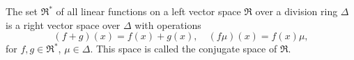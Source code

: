 The set $\mathfrak{R}^*$ of all linear functions on a left vector space $\mathfrak{R}$ over a division ring $\Delta$ is a right vector space over $\Delta$ with operations
$$
(f + g)(x) = f(x) + g(x), \quad (f\mu)(x) = f(x)\mu,
$$
for $f, g \in \mathfrak{R}^*$, $\mu \in \Delta$. This space is called the conjugate space of $\mathfrak{R}$.
